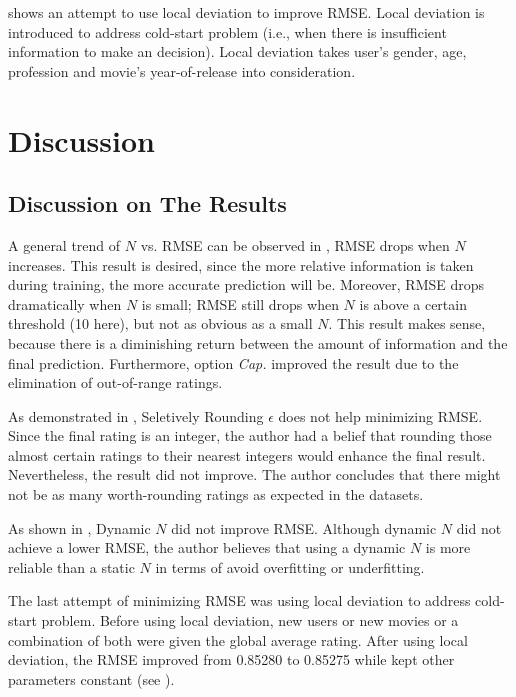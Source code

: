 \documentclass{ece}
\begin{document}
 shows an attempt to use local deviation to improve RMSE.
Local deviation is introduced to address cold-start problem (i.e., when there is insufficient information to make an decision).
Local deviation takes user's gender, age, profession and movie's year-of-release into consideration.

\newpage
\section{Discussion}

\subsection{Discussion on The Results}
\label{result-discuss}

A general trend of $N$ vs. RMSE can be observed in , RMSE drops when $N$ increases.
This result is desired, since the more relative information is taken during training, the more accurate prediction will be.
Moreover, RMSE drops dramatically when $N$ is small; RMSE still drops when $N$ is above a certain threshold (10 here), but not as obvious as a small $N$.
This result makes sense, because there is a diminishing return between the amount of information and the final prediction.
Furthermore, option \textit{Cap.} improved the result due to the elimination of out-of-range ratings.

As demonstrated in , Seletively Rounding $\epsilon$ does not help minimizing RMSE.
Since the final rating is an integer, the author had a belief that rounding those almost certain ratings to their nearest integers would enhance the final result.
Nevertheless, the result did not improve.
The author concludes that there might not be as many worth-rounding ratings as expected in the datasets.

As shown in , Dynamic $N$ did not improve RMSE.
Although dynamic $N$ did not achieve a lower RMSE, the author believes that using a dynamic $N$ is more reliable than a static $N$ in terms of avoid overfitting or underfitting.

The last attempt of minimizing RMSE was using local deviation to address cold-start problem.
Before using local deviation, new users or new movies or a combination of both were given the global average rating.
After using local deviation, the RMSE improved from 0.85280 to 0.85275 while kept other parameters constant (see ).
\end{document}
